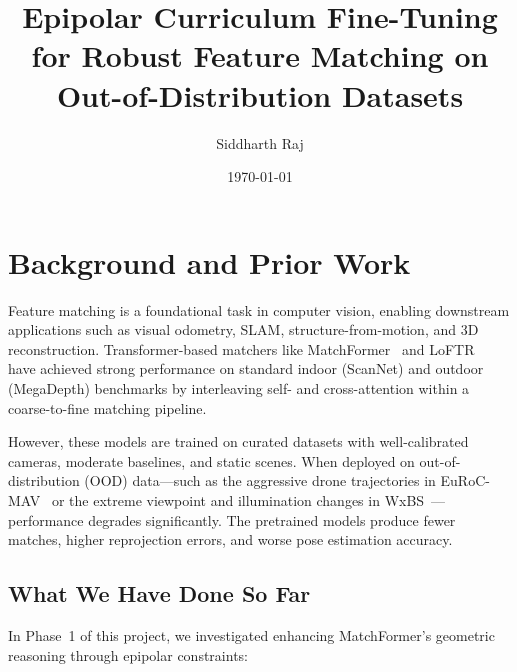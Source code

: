 \documentclass[11pt,a4paper]{article}
\title{Epipolar Curriculum Fine-Tuning for Robust Feature Matching on Out-of-Distribution Datasets}
\author{Siddharth Raj}
\date{\today}
\begin{document}
\maketitle

\section{Background and Prior Work}

Feature matching is a foundational task in computer vision, enabling downstream applications such as visual odometry, SLAM, structure-from-motion, and 3D reconstruction. Transformer-based matchers like MatchFormer~\cite{wang2022matchformer} and LoFTR~\cite{sun2021loftr} have achieved strong performance on standard indoor (ScanNet) and outdoor (MegaDepth) benchmarks by interleaving self- and cross-attention within a coarse-to-fine matching pipeline.

However, these models are trained on curated datasets with well-calibrated cameras, moderate baselines, and static scenes. When deployed on out-of-distribution (OOD) data---such as the aggressive drone trajectories in EuRoC-MAV~\cite{burri2016euroc} or the extreme viewpoint and illumination changes in WxBS~\cite{mishkin2015wxbs}---performance degrades significantly. The pretrained models produce fewer matches, higher reprojection errors, and worse pose estimation accuracy.

\subsection{What We Have Done So Far}

In Phase~1 of this project, we investigated enhancing MatchFormer's geometric reasoning through epipolar constraints:
\end{document}
